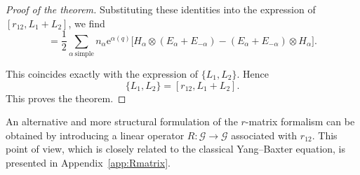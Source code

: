 \begin{proof}[Proof of the theorem]
    Substituting these identities into the expression of $[r_{12},L_1+L_2]$, we find
    \begin{equation}
        [r_{12},L_1+L_2]
        =
        \frac12 \sum_{\alpha\ \text{simple}}
        n_\alpha \mathrm{e}^{\alpha(q)}
        \bigl[
        H_\alpha \otimes (E_\alpha + E_{-\alpha})
        -
        (E_\alpha + E_{-\alpha}) \otimes H_\alpha
        \bigr].
    \end{equation}

    This coincides exactly with the expression of $\{L_1,L_2\}$. Hence
    \begin{equation}
        \{L_1,L_2\} = [r_{12},L_1+L_2].
    \end{equation}
    This proves the theorem.
\end{proof}


An alternative and more structural formulation of the $r$-matrix formalism can be obtained by introducing a linear operator $R:\mathcal G \to \mathcal G$ associated with $r_{12}$.
This point of view, which is closely related to the classical Yang--Baxter equation, is presented in Appendix~\ref{app:Rmatrix}.
